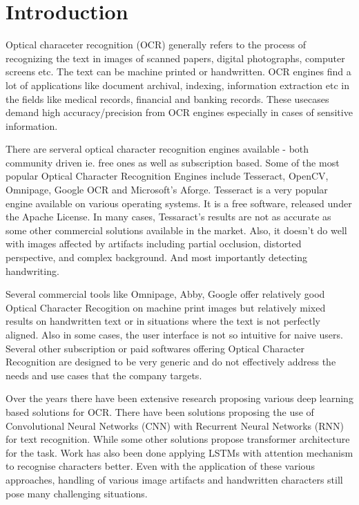 %

\chapter{Introduction}
Optical characeter recognition (OCR) generally refers to the process of recognizing the text in images of scanned papers, digital photographs, computer screens etc. The text can be machine printed or handwritten. OCR engines find a lot of applications like document archival, indexing, information extraction etc in the fields like medical records, financial and banking records. These usecases demand high accuracy/precision from OCR engines especially in cases of sensitive information.

There are serveral optical character recognition engines available - both community driven ie. free ones as well as subscription based. Some of the most popular Optical Character Recognition Engines include Tesseract, OpenCV, Omnipage, Google OCR and Microsoft's Aforge. Tesseract is a very popular engine available on various operating systems. It is a free software, released under the Apache License. In many cases, Tessaract's results are not as accurate as some other commercial solutions available in the market. Also, it doesn't do well with images affected by artifacts including partial occlusion, distorted perspective, and complex background. And most importantly detecting handwriting.

Several commercial tools like Omnipage, Abby, Google offer relatively good Optical Character Recogition on machine print images but relatively mixed results on handwritten text or in situations where the text is not perfectly aligned. Also in some cases, the user interface is not so intuitive for naive users. Several other subscription or paid softwares offering Optical Character Recognition are designed to be very generic and do not effectively address the needs and use cases that the company targets.

Over the years there have been extensive research proposing various deep learning based solutions for OCR. There have been solutions proposing the use of Convolutional Neural Networks (CNN) with Recurrent Neural Networks (RNN) for text recognition. While some other solutions propose transformer architecture for the task. Work has also been done applying LSTMs with attention mechanism to recognise characters better. Even with the application of these various approaches, handling of various image artifacts and handwritten characters still pose many challenging situations.

